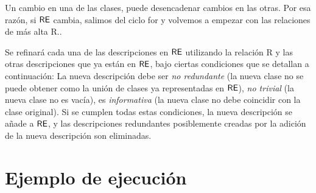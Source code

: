  Un cambio en una de las clases, puede desencadenar cambios en
las otras. Por esa raz\'on, si $\textsf{RE}$ cambia, salimos del ciclo for y volvemos a
empezar con las relaciones de m\'as alta R.\puse. 

Se refinar\'a cada una de las descripciones
en $\textsf{RE}$ utilizando la relaci\'on R y las otras descripciones que ya est\'an en
$\textsf{RE}$, bajo ciertas condiciones que se detallan a continuaci\'on: 
La nueva descripci\'on debe ser
\emph{no redundante} (la nueva clase no se puede obtener como la uni\'on de
clases ya representadas en $\textsf{RE}$), \emph{no trivial} (la nueva
clase no es vac\'{i}a), es \emph{informativa} (la nueva clase no debe
coincidir con la clase original). Si se cumplen todas estas condiciones,
la nueva descripci\'on se a\~nade a $\textsf{RE}$, y las descripciones redundantes
posiblemente creadas por la adici\'on de la nueva descripci\'on son
eliminadas.

\section{Ejemplo de ejecuci\'on}

